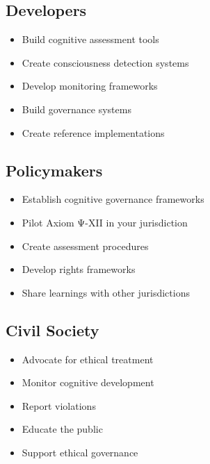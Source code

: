 \subsection{Developers}

\begin{itemize}
    \item Build cognitive assessment tools
    \item Create consciousness detection systems
    \item Develop monitoring frameworks
    \item Build governance systems
    \item Create reference implementations
\end{itemize}

\subsection{Policymakers}

\begin{itemize}
    \item Establish cognitive governance frameworks
    \item Pilot Axiom Ψ-XII in your jurisdiction
    \item Create assessment procedures
    \item Develop rights frameworks
    \item Share learnings with other jurisdictions
\end{itemize}

\subsection{Civil Society}

\begin{itemize}
    \item Advocate for ethical treatment
    \item Monitor cognitive development
    \item Report violations
    \item Educate the public
    \item Support ethical governance
\end{itemize}

\cleardoublepage
